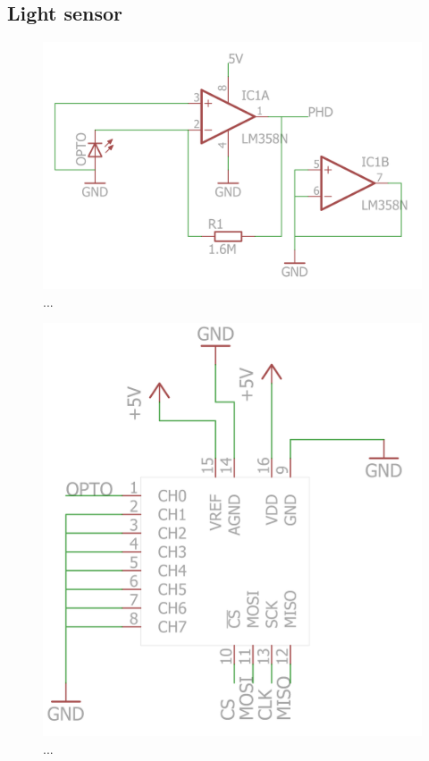

\subsection{Light sensor}


\begin{figure}[H]
\centering 
\includegraphics[width = 0.4 \textwidth]{images/optoamplifier_schematics}
\caption{...}
\label{fig:...}
\end{figure}


\begin{figure}[H]
\centering 
\includegraphics[width = 0.4 \textwidth]{images/ADC_schematics}
\caption{...}
\label{fig:...}
\end{figure}